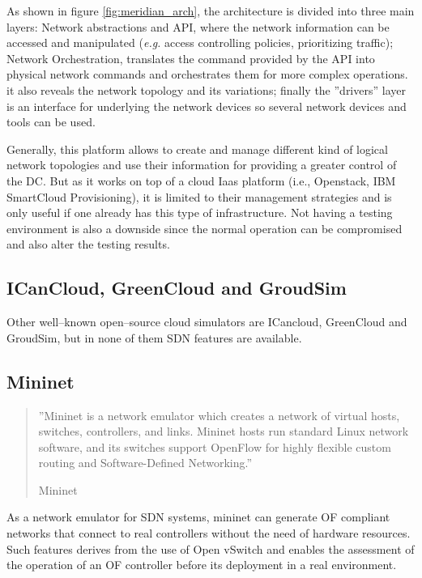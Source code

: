 \documentclass[12pt,english,oneside]{book}
\begin{document}
As shown in figure \ref{fig:meridian_arch}, the architecture is divided into three main layers: Network abstractions and API, where the network information can be accessed and manipulated (\textit{e.g.} access controlling policies, prioritizing traffic); Network Orchestration, translates the command provided by the API into physical network commands and orchestrates them for more complex operations. it also reveals the network topology and its variations; finally the ''drivers'' layer is an interface for underlying the network devices so several network devices and tools can be used.

Generally, this platform allows to create and manage different kind of logical network topologies and use their information for providing a greater control of the DC.
But as it works on top of a cloud Iaas platform (i.e., Openstack\cite{openstack}, IBM SmartCloud Provisioning\cite{scp}), it is limited to their management strategies and is only useful if one already has this type of infrastructure. Not having a testing environment is also a downside since the normal operation can be compromised and also alter the testing results.

\subsection{ICanCloud, GreenCloud and GroudSim}
\hspace{0.6cm}

Other well--known open--source cloud simulators are ICancloud\cite{icancloud}, GreenCloud\cite{greencloud} and GroudSim\cite{groudsim}, but in none of them SDN features are available.

\newpage
\subsection{Mininet}
\hspace{0.6cm}
\begin{quotation}

''Mininet is a network emulator which creates a network of virtual hosts, switches, controllers, and links. Mininet hosts run standard Linux network software, and its switches support OpenFlow for highly flexible custom routing and Software-Defined Networking.''

\hfill Mininet \cite{mininet}
\end{quotation}

As a network emulator for SDN systems, mininet can generate OF compliant networks that connect to real controllers without the need of hardware resources. Such features derives from the use of Open vSwitch and enables the assessment of the operation of an OF controller before its deployment in a real environment.
\end{document}
